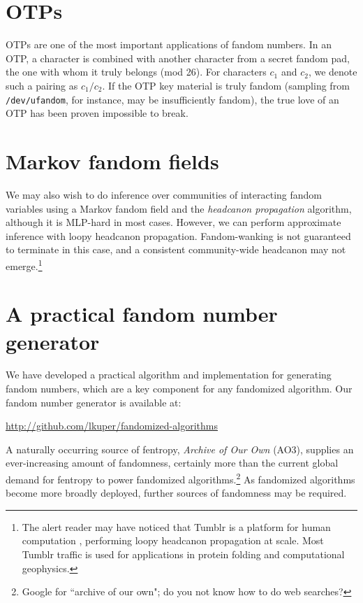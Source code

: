 \documentclass[9pt]{sigplanconf}
\begin{document}
\section{OTPs}
OTPs are one of the most important applications of fandom numbers.  In
an OTP, a character is combined with another character from a secret
fandom pad, the one with whom it truly belongs (mod 26).  For
characters $c_1$ and $c_2$, we denote such a pairing as $c_1/c_2$.  If
the OTP key material is truly fandom (sampling from {\tt
  /dev/ufandom}, for instance, may be insufficiently fandom), the true
love of an OTP has been proven impossible to break.

\section{Markov fandom fields}
We may also wish to do inference over communities of interacting
fandom variables using a Markov fandom field and the \emph{headcanon
  propagation} algorithm, although it is MLP-hard in most cases.
However, we can perform approximate inference with loopy headcanon
propagation.  Fandom-wanking is not guaranteed to terminate in this
case, and a consistent community-wide headcanon may not
emerge.\footnote{The alert reader may have noticed that Tumblr is a
  platform for human computation \cite{luisvonahn}, performing loopy
  headcanon propagation at scale. Most Tumblr traffic is used for
  applications in protein folding and computational geophysics.}

\section{A practical fandom number generator}
We have developed a practical algorithm and implementation for
generating fandom numbers, which are a key component for any
fandomized algorithm. Our fandom number generator is available at:
\begin{center}
\url{http://github.com/lkuper/fandomized-algorithms}
\end{center}
\noindent A naturally occurring source of fentropy, \textit{Archive of
  Our Own} (AO3), supplies an ever-increasing amount of fandomness,
certainly more than the current global demand for fentropy to power
fandomized algorithms.\footnote{Google for ``archive of our own"; do
  you not know how to do web searches?\footnotemark} As fandomized algorithms become more broadly
deployed, further sources of fandomness may be required.
\end{document}
